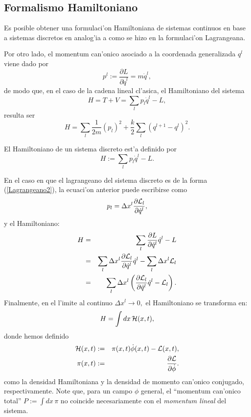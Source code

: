 \subsection{Formalismo Hamiltoniano}
Es posible obtener una formulaci'on Hamiltoniana de sistemas continuos
en base a sistemas discretos en analog'ia a como se hizo en la
formulaci'on Lagrangeana.

Por otro lado, el momentum can'onico asociado a la coordenada generalizada $q^l$
viene dado por
\begin{equation}
p^l:=\frac{\partial L}{\partial\dot{q}^{l}}=m\dot{q}^l,
\end{equation}
de modo que, en el caso de la cadena lineal cl'asica, el Hamiltoniano del
sistema
\begin{equation}
H=T+V=\sum_l p_l \dot{q}^l-L,
\end{equation}
resulta ser
\begin{equation}
H=\sum_l \frac{1}{2m}(p_l)^2+ \frac{k}{2}\sum_l \left(q^{l+1}-q^l\right)^2.
\end{equation}

El Hamiltoniano de un sistema discreto est'a definido por 
\begin{equation}
H:=\sum_l p_{l}\dot{q}^{l}-L .
\end{equation}

En el caso en que el lagrangeano del sistema discreto es de la
forma (\ref{Lagrangeano2}), la ecuaci'on anterior puede escribirse
como
\begin{equation}
p_{l}=\Delta x^{l}\frac{\partial{\cal L}_{l}}{\partial\dot{q}^{l}},
\end{equation}
y el Hamiltoniano: 
\begin{eqnarray}
H & = &\sum_l \frac{\partial L}{\partial\dot{q}^{l}}\dot{q}^{l}-L\\
& = &\sum_{l}\Delta x^{l}\frac{\partial{\cal L}_{l}}{\partial\dot{q}^{l}}\dot
{q}^{l}-\sum_{l}\Delta x^{l}{\cal L}_{l}\\
& = &\sum_{l}\Delta x^{l}\left( \frac{\partial{\cal
L}_{l}}{\partial\dot{q}^{l}}\dot{q}^{l}-{\cal L}_{l}\right).
\end{eqnarray}
Finalmente, en el l'imite al continuo $\Delta x^{l}\rightarrow0,$ el
Hamiltoniano
se transforma en: 
\begin{equation}
H=\int dx\, {\cal H}(x,t) \label{HamiltonianoTotal} ,
\end{equation}
donde hemos definido 
\begin{eqnarray}
{\cal H}(x,t) & := &\pi(x,t) \dot{\phi}(x,t)-{\cal L}(x,t) ,\\
\pi(x,t) & := &\frac{\partial{\cal L}}{\partial\dot{\phi}}.
\end{eqnarray}
como  la densidad Hamiltoniana y la densidad de momento can'onico conjugado,
respectivamente. Note que, para un campo $\phi$ general, el ``momentum can'onico
total'' $P:=\int dx\, \pi$ no coincide necesariamente con el \textit{momentum
lineal} del sistema.



